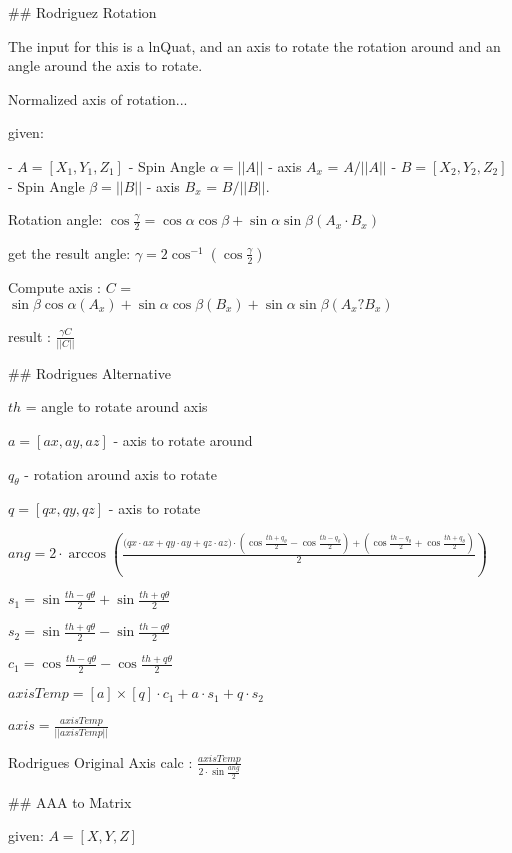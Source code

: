 ## Rodriguez Rotation

The input for this is a lnQuat, and an axis to rotate the rotation around and an angle around the axis to rotate.

Normalized axis of rotation...

given: 

- ${A} = [X_1, Y_1 ,Z_1] $   
  - Spin Angle $\alpha = ||A||$
  - axis $A_x$ = $A/||A||$
- ${B} = [X_2, Y_2 ,Z_2] $  
  - Spin Angle $\beta = ||B||$
  - axis $B_x$ = $B/||B||$.

Rotation angle: $\cos \frac{\gamma}{2} = \cos \alpha   \cos \beta  + \sin \alpha    \sin \beta  (  A_x \cdot B_x )$

get the result angle: $ \gamma = 2 \cos^{-1}( \cos \frac {\gamma}{2} )$


Compute axis : $C$ = $  \sin \beta  \cos \alpha  (A_x)  + \sin \alpha  \cos \beta (B_x) + \sin \alpha \sin \beta  ( A_x ? B_x ) $

result : $\frac {\gamma C} {||C||}$

## Rodrigues Alternative 

$th$ = angle to rotate around axis

$a = [ax,ay,az]$ - axis to rotate around

$q_{\theta}$ - rotation around axis to rotate

$ q = [qx,qy,qz]$ - axis to rotate

${ang} = 2 \cdot \arccos  ( \frac { ({{qx} \cdot {ax}+{qy}\cdot{ay}+{qz}\cdot{az})}\cdot({\cos {\frac {{th} + {q_\theta}} 2}}-{\cos {\frac {{th} - {q_\theta}} 2}}) + ( {\cos {\frac {{th} - {q_\theta}} 2}} + {\cos {\frac {{th} + {q_\theta}} 2}} ) } 2   )$

${s_1} = {\sin {\frac {{th} - {q\theta}} 2}} + {\sin {\frac {{th} + {q\theta}} 2}} $

${s_2} = {\sin {\frac {{th} + {q\theta}} 2}} - {\sin {\frac {{th} - {q\theta}} 2}} $

${c_1} = {\cos {\frac {{th} - {q\theta}} 2}} - {\cos {\frac {{th} + {q\theta}} 2}} $

${axisTemp} = {[{a}] \times [{q}]}\cdot {c_1} + {a}\cdot{s_1} + {q}\cdot{s_2} $

${axis} = \frac {axisTemp} { ||{axisTemp}|| } $

Rodrigues Original Axis calc : $\frac {axisTemp} {2 \cdot \sin  \frac {ang} 2 } $



## AAA to Matrix

given: ${A} = [X, Y ,Z] $

